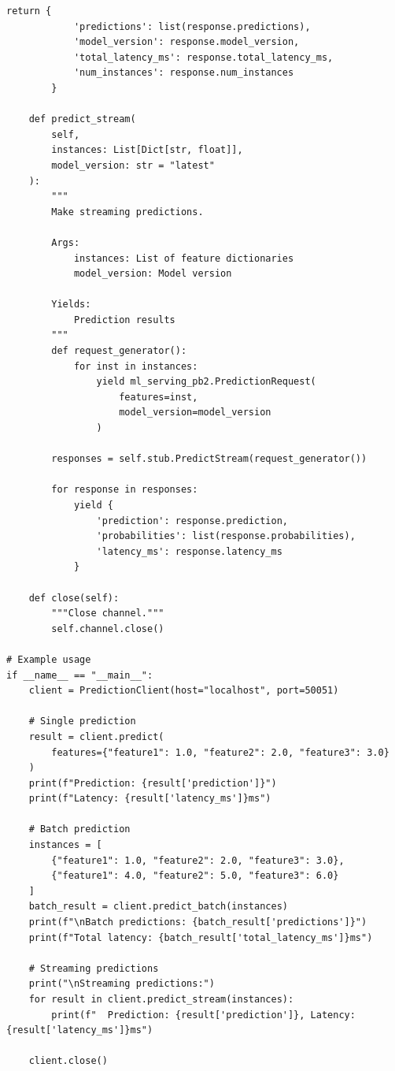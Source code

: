 \begin{lstlisting}[style=python, caption={gRPC Client Implementation}]
        return {
            'predictions': list(response.predictions),
            'model_version': response.model_version,
            'total_latency_ms': response.total_latency_ms,
            'num_instances': response.num_instances
        }

    def predict_stream(
        self,
        instances: List[Dict[str, float]],
        model_version: str = "latest"
    ):
        """
        Make streaming predictions.

        Args:
            instances: List of feature dictionaries
            model_version: Model version

        Yields:
            Prediction results
        """
        def request_generator():
            for inst in instances:
                yield ml_serving_pb2.PredictionRequest(
                    features=inst,
                    model_version=model_version
                )

        responses = self.stub.PredictStream(request_generator())

        for response in responses:
            yield {
                'prediction': response.prediction,
                'probabilities': list(response.probabilities),
                'latency_ms': response.latency_ms
            }

    def close(self):
        """Close channel."""
        self.channel.close()

# Example usage
if __name__ == "__main__":
    client = PredictionClient(host="localhost", port=50051)

    # Single prediction
    result = client.predict(
        features={"feature1": 1.0, "feature2": 2.0, "feature3": 3.0}
    )
    print(f"Prediction: {result['prediction']}")
    print(f"Latency: {result['latency_ms']}ms")

    # Batch prediction
    instances = [
        {"feature1": 1.0, "feature2": 2.0, "feature3": 3.0},
        {"feature1": 4.0, "feature2": 5.0, "feature3": 6.0}
    ]
    batch_result = client.predict_batch(instances)
    print(f"\nBatch predictions: {batch_result['predictions']}")
    print(f"Total latency: {batch_result['total_latency_ms']}ms")

    # Streaming predictions
    print("\nStreaming predictions:")
    for result in client.predict_stream(instances):
        print(f"  Prediction: {result['prediction']}, Latency: {result['latency_ms']}ms")

    client.close()
\end{lstlisting}

